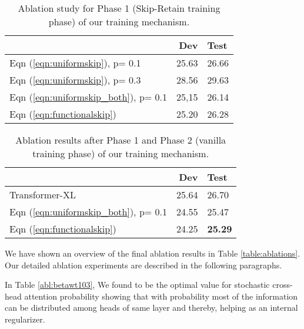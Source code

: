 \documentclass[11pt]{article}
\begin{document}
\begin{table}[!htb]

\centering
\begin{tabular}{lrl}
\hline \textbf{} & \textbf{Dev} & \textbf{Test} \\ \hline
Eqn (\ref{eqn:uniformskip}), p= 0.1 & 25.63 & 26.66  \\
Eqn (\ref{eqn:uniformskip}), p= 0.3 & 28.56 & 29.63  \\
Eqn (\ref{eqn:uniformskip_both}), p= 0.1 & 25,15 & 26.14  \\
Eqn (\ref{eqn:functionalskip}) &  25.20 & 26.28  \\

\hline
\end{tabular}
\caption{ Ablation study for Phase 1 (Skip-Retain training phase) of our training mechanism.}
\label{table:sdwt103}
\end{table}
      



\begin{table}[!htb]
\centering

\begin{tabular}{lrl}
\hline \textbf{} & \textbf{Dev} & \textbf{Test} \\ \hline
Transformer-XL &  25.64 & 26.70 \\
\hline
Eqn (\ref{eqn:uniformskip_both}), p= 0.1 & 24.55 & 25.47  \\
Eqn (\ref{eqn:functionalskip}) &  24.25 & \textbf{25.29}  \\

\hline
\end{tabular}
\caption{ Ablation results after Phase 1 and Phase 2 (vanilla training phase) of our training mechanism.}
\label{table:sdfinewt103}

\end{table}





We have shown an overview of the final ablation results in Table \ref{table:ablations}. Our detailed ablation experiments are described in the following paragraphs.



In Table \ref{abl:betawt103}, We found  to be the optimal value for stochastic cross-head attention probability showing that with  probability most of the information can be distributed among heads of same layer and thereby, helping as an internal regularizer. 
\end{document}
